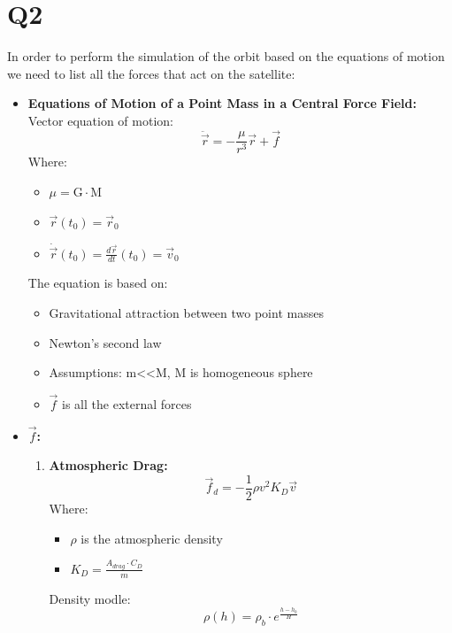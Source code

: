 \documentclass[11pt, a4paper]{article}
\begin{document}
\section{Q2}
In order to perform the simulation of the orbit based on the equations of motion we need to list all the forces that act on the satellite:
\begin{itemize}
    \item \textbf{\Large Equations of Motion of a Point Mass in a Central Force Field:}\\
    Vector equation of motion:
    \begin{equation}
        \ddot \vec{r} = -\frac{\mu}{r^3}\vec{r}+\vec{f}
    \end{equation}
    Where:
    \begin{itemize}
        \item $\mu = \text{G}\cdot \text{M}$
        \item $\vec{r}(t_0) = \vec{r}_0$
        \item $\dot \vec{r}(t_0) = \frac{d\vec{r}}{dt}(t_0) = \vec{v}_0$
    \end{itemize}
    The equation is based on:
    \begin{itemize}
        \item Gravitational attraction between two point masses
        \item Newton's second law
        \item Assumptions: m<<M, M is homogeneous sphere
        \item $\vec{f}$ is all the external forces 
    \end{itemize}
    \item \textbf{\Large $\vec{f}$:}
    \begin{enumerate}
        \item \textbf{\large Atmospheric Drag:}  \begin{equation}
            \vec{f}_d = -\frac{1}{2}\rho v^2K_D\vec{v}
        \end{equation}
        Where:
        \begin{itemize}
            \item $\rho$ is the atmospheric density
            \item $\displaystyle{K_D = \frac{A_{drag}\cdot C_D}{m}}$
        \end{itemize}
        Density modle:
        \begin{equation}
            \rho(h) = \rho_b\cdot e^{\frac{h-h_b}{H}}
        \end{equation}

\end{enumerate}
\end{itemize}
\end{document}
